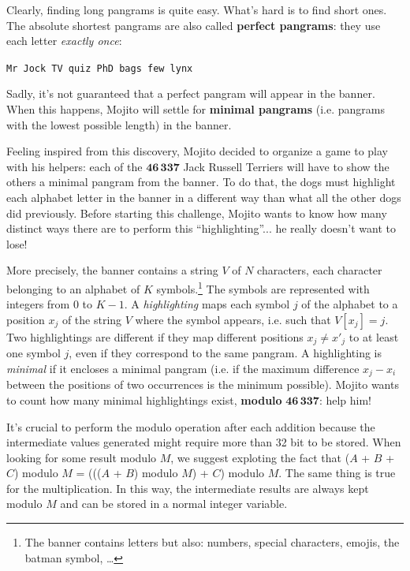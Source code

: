 Clearly, finding long pangrams is quite easy. What's hard is to find short ones.
The absolute shortest pangrams are also called \textbf{perfect pangrams}: they
use each letter \emph{exactly once}:%
%
\begin{center}
  \texttt{Mr Jock TV quiz PhD bags few lynx}
\end{center}%
%
Sadly, it's not guaranteed that a perfect pangram will appear in the banner.
When this happens, Mojito will settle for \textbf{minimal pangrams} (i.e.
pangrams with the lowest possible length) in the banner.

Feeling inspired from this discovery, Mojito decided to organize a game to play
with his helpers: each of the $\mathbf{46\,337}$ Jack Russell Terriers will have
to show the others a minimal pangram from the banner. To do that, the dogs must
highlight each alphabet letter in the banner in a different way than what all
the other dogs did previously. Before starting this challenge, Mojito wants to
know how many distinct ways there are to perform this ``highlighting''... he
really doesn't want to lose!

More precisely, the banner contains a string $V$ of $N$ characters, each
character belonging to an alphabet of $K$ symbols.\footnote{The banner contains
letters but also: numbers, special characters, emojis, the batman symbol, \dots}
The symbols are represented with integers from $0$ to $K-1$. A
\emph{highlighting} maps each symbol $j$ of the alphabet to a position $x_j$ of
the string $V$ where the symbol appears, i.e. such that $V[x_j] = j$. Two
highlightings are different if they map different positions $x_j \neq x'_j$ to
at least one symbol $j$, even if they correspond to the same pangram. A
highlighting is \emph{minimal} if it encloses a minimal pangram (i.e. if the
maximum difference $x_j - x_i$ between the positions of two occurrences is the
minimum possible). Mojito wants to count how many minimal highlightings exist,
\textbf{modulo} $\mathbf{46\,337}$: help him!



\Implementation

\begin{danger}
  It's crucial to perform the modulo operation after each addition because the
  intermediate values generated might require more than 32 bit to be stored.
  When looking for some result modulo $M$, we suggest exploting the fact that
  ($A$ + $B$ + $C$) modulo $M$ = ((($A$ + $B$) modulo $M$) + $C$) modulo $M$.
  The same thing is true for the multiplication. In this way, the intermediate
  results are always kept modulo $M$ and can be stored in a normal integer
  variable.
\end{danger}

